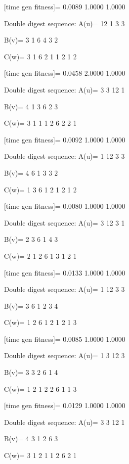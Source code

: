 [time gen fitness]=
    0.0089    1.0000    1.0000

Double digest sequence:
A(u)=
    12     1     3     3

B(v)=
     3     1     6     4     3     2

C(w)=
     3     1     6     2     1     1     2     1     2

[time gen fitness]=
    0.0458    2.0000    1.0000

Double digest sequence:
A(u)=
     3     3    12     1

B(v)=
     4     1     3     6     2     3

C(w)=
     3     1     1     1     2     6     2     2     1

[time gen fitness]=
    0.0092    1.0000    1.0000

Double digest sequence:
A(u)=
     1    12     3     3

B(v)=
     4     6     1     3     3     2

C(w)=
     1     3     6     1     2     1     2     1     2

[time gen fitness]=
    0.0080    1.0000    1.0000

Double digest sequence:
A(u)=
     3    12     3     1

B(v)=
     2     3     6     1     4     3

C(w)=
     2     1     2     6     1     3     1     2     1

[time gen fitness]=
    0.0133    1.0000    1.0000

Double digest sequence:
A(u)=
     1    12     3     3

B(v)=
     3     6     1     2     3     4

C(w)=
     1     2     6     1     2     1     2     1     3

[time gen fitness]=
    0.0085    1.0000    1.0000

Double digest sequence:
A(u)=
     1     3    12     3

B(v)=
     3     3     2     6     1     4

C(w)=
     1     2     1     2     2     6     1     1     3

[time gen fitness]=
    0.0129    1.0000    1.0000

Double digest sequence:
A(u)=
     3     3    12     1

B(v)=
     4     3     1     2     6     3

C(w)=
     3     1     2     1     1     2     6     2     1

